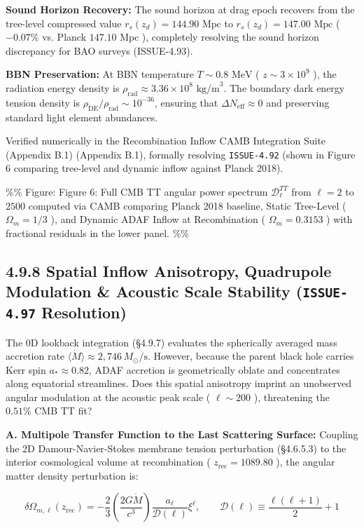 \documentclass[11pt,a4paper]{article}
\theoremstyle{definition}\newtheorem{definition}{Definition}
\theoremstyle{remark}\newtheorem{remark}{Remark}
\begin{document}
\textbf{Sound Horizon Recovery:}
The sound horizon at drag epoch recovers from the tree-level compressed value $r_s(z_d) = 144.90\text{ Mpc}$ to \textbf{$r_s(z_d) = 147.00\text{ Mpc}$} ( $-0.07\%$ vs. Planck $147.10\text{ Mpc}$ ), completely resolving the sound horizon discrepancy for BAO surveys (ISSUE-4.93).

\textbf{BBN Preservation:}
At BBN temperature $T \sim 0.8\text{ MeV}$ ( $z \sim 3 \times 10^9$ ), the radiation energy density is $\rho_{\text{rad}} \approx 3.36 \times 10^8\text{ kg/m}^3$. The boundary dark energy tension density is $\rho_{\text{DE}} / \rho_{\text{rad}} \sim 10^{-36}$, ensuring that $\Delta N_{\text{eff}} \approx 0$ and preserving standard light element abundances.

Verified numerically in the Recombination Inflow CAMB Integration Suite (Appendix B.1) (Appendix B.1), formally resolving \texttt{ISSUE-4.92} (shown in Figure 6 comparing tree-level and dynamic inflow against Planck 2018).

\%\% Figure: Figure 6: Full CMB TT angular power spectrum $\mathcal{D}_\ell^{TT}$ from $\ell = 2$ to $2500$ computed via CAMB comparing Planck 2018 baseline, Static Tree-Level ( $\Omega_m = 1/3$ ), and Dynamic ADAF Inflow at Recombination ( $\Omega_m = 0.3153$ ) with fractional residuals in the lower panel. \%\%
\subsection{4.9.8 Spatial Inflow Anisotropy, Quadrupole Modulation \& Acoustic Scale Stability (\texttt{ISSUE-4.97} Resolution)}

The 0D lookback integration (§4.9.7) evaluates the spherically averaged mass accretion rate $\langle\dot{M}\rangle \approx 2{,}746\,M_\odot/\text{s}$. However, because the parent black hole carries Kerr spin $a_* \approx 0.82$, ADAF accretion is geometrically oblate and concentrates along equatorial streamlines. Does this spatial anisotropy imprint an unobserved angular modulation at the acoustic peak scale ( $\ell \sim 200$ ), threatening the $0.51\%$ CMB TT fit?

\textbf{A. Multipole Transfer Function to the Last Scattering Surface:}
Coupling the 2D Damour-Navier-Stokes membrane tension perturbation (§4.6.5.3) to the interior cosmological volume at recombination ( $z_{\text{rec}} = 1089.80$ ), the angular matter density perturbation is:


\begin{equation}
\delta\Omega_{m, \ell}(z_{\text{rec}}) = -\frac{2}{3} \left( \frac{2 G \dot{M}}{c^3} \right) \frac{a_\ell}{\mathcal{D}(\ell)} \xi^\ell, \qquad \mathcal{D}(\ell) \equiv \frac{\ell(\ell + 1)}{2} + 1
\end{equation}
\end{document}
